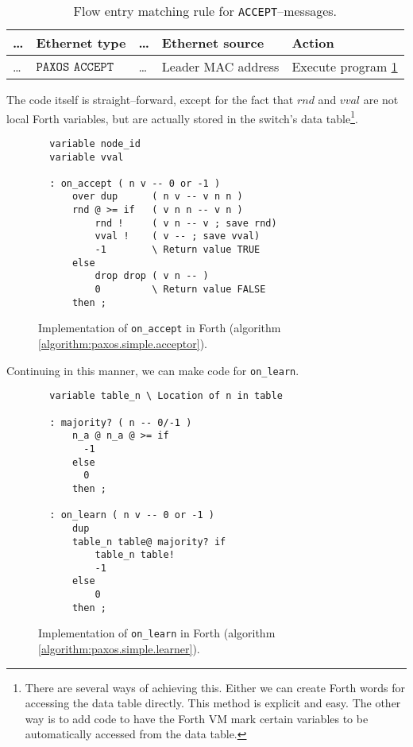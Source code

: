 \begin{table}[H]
  \begin{tabular}{l|l|l|l|l|}
    \hline
      \dots &
      \textbf{Ethernet type} &
      \dots &
      \textbf{Ethernet source} &
      \textbf{Action}
      \\
    \hline
      \dots &
      $\texttt{PAXOS ACCEPT}$
      & \dots
      & Leader MAC address
      & Execute program \ref{program:forth.on-accept}
      \\
    \hline
  \end{tabular}
  \caption{Flow entry matching rule for \texttt{ACCEPT}--messages.}
  \label{table:matching.simple.accept}
\end{table}

The code itself is straight--forward, except for the fact that $rnd$ and
$vval$ are not local Forth variables, but are actually stored in the
switch's data table\footnote{There are several ways of achieving this.
Either we can create Forth words for accessing the data table directly.
This method is explicit and easy.  The other way is to add code to have
the Forth VM mark certain variables to be automatically accessed from the
data table.}.

\begin{figure}[H]
  \centering
  \begin{Verbatim}
  variable node_id
  variable vval

  : on_accept ( n v -- 0 or -1 )
      over dup      ( n v -- v n n )
      rnd @ >= if   ( v n n -- v n )
          rnd !     ( v n -- v ; save rnd)
          vval !    ( v -- ; save vval)
          -1        \ Return value TRUE
      else
          drop drop ( v n -- )
          0         \ Return value FALSE
      then ;
  \end{Verbatim}
  \caption{Implementation of \texttt{on\_{}accept} in Forth
            (algorithm \ref{algorithm:paxos.simple.acceptor}).}
  \label{program:forth.on-accept}
\end{figure}

Continuing in this manner, we can make code for \texttt{on\_{}learn}.

\begin{figure}[H]
  \centering
  \begin{Verbatim}
  variable table_n \ Location of n in table

  : majority? ( n -- 0/-1 )
      n_a @ n_a @ >= if
        -1
      else
        0
      then ;

  : on_learn ( n v -- 0 or -1 )
      dup
      table_n table@ majority? if
          table_n table!
          -1
      else
          0
      then ;
  \end{Verbatim}
  \caption{Implementation of \texttt{on\_{}learn} in Forth (algorithm \ref{algorithm:paxos.simple.learner}).}
  \label{program:forth.on-learn}
\end{figure}

